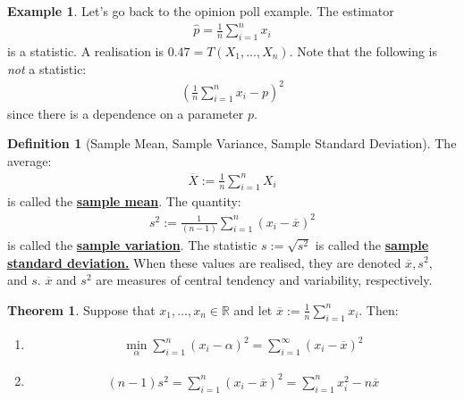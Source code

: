 \documentclass[11pt]{scrartcl}
\newcommand{\R}[0]{\mathbb{R}}
\theoremstyle{definition}
\newtheorem{theorem}{Theorem}
\newtheorem{definition}{Definition}
\newtheorem{ex}{Example}
\theoremstyle{remark}
\newcommand{\dfn}[1]{\textbf{\underline{#1}}}
\newcommand{\stat}[0]{T(X_1, ..., X_n )}
\newcommand{\smean}[0]{\frac{1}{n} \sum_{i=1}^n x_i}
\newcommand{\svar}[0]{\frac{1}{(n-1)} \sum_{i=1}^n (x_i - \overline{x})^2}
\begin{document}
\begin{ex} Let's go back to the opinion poll example. The estimator 
\begin{align*}
\hat{p} = \frac{1}{n} \sum_{i=1}^n x_i	
\end{align*}
	is a statistic. A realisation is $0.47 = \stat$. Note that the following is \emph{not} a statistic: 
	\begin{align}
		\left( \frac{1}{n} \sum_{i=1}^n x_i - p \right)^2
	\end{align}
	since there is a dependence on a parameter $p$. 
\end{ex}

\begin{definition}[Sample Mean, Sample Variance, Sample Standard Deviation] The average: 
\begin{align}
	\overline{X} := \frac{1}{n} \sum_{i=1}^n X_i 
\end{align}
is called the \dfn{sample mean}. The quantity: 
\begin{align}
	s^2 := \svar 
\end{align}
is called the \dfn{sample variation}. The statistic $s := \sqrt{s^2}$ is called the \dfn{sample standard deviation.} When these values are realised, they are denoted $\overline{x}, s^2,$ and $s$. $\overline{x}$ and $s^2$ are measures of central tendency and variability, respectively. 

\begin{theorem}
	Suppose that $x_1, ..., x_n \in \R$ and let $\overline{x} := \smean$. Then: 
	\begin{enumerate}[noitemsep]
		\item 
		\begin{align}
			\min_\alpha \sum_{i=1}^n (x_i - \alpha)^2 = \sum_{i=1}^\infty (x_i - \overline{x})^2 
		\end{align}
		\item 
		\begin{align}
			(n-1)s^2 = \sum_{i=1}^n (x_i - \overline{x})^2 = \sum_{i=1}^n x_i^2 - n \overline{x} 
		\end{align}
	\end{enumerate}
\end{theorem}
\end{definition}
\end{document}
